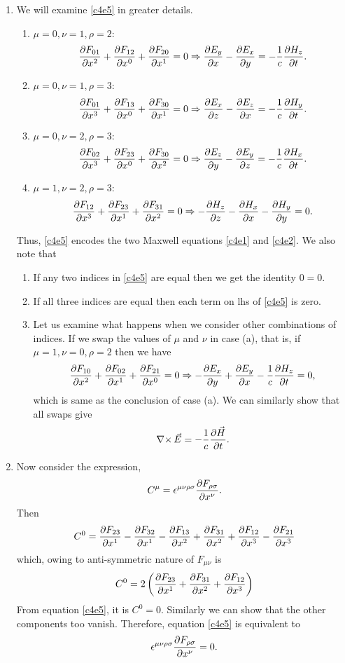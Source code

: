 \begin{enumerate}
\item We will examine \eqref{c4e5} in greater details.
\begin{enumerate}
\item $\mu = 0, \nu = 1, \rho = 2$:
\[
\frac{\partial{F_{01}}}{\partial{x^2}} + \frac{\partial{F_{12}}}{\partial{x^0}} + \frac{\partial{F_{20}}}{\partial{x^1}} = 0 \Rightarrow
\frac{\partial{E_y}}{\partial{x}} - \frac{\partial{E_x}}{\partial{y}} = - \frac{1}{c}\frac{\partial{H_z}}{\partial{t}}.
\]

\item $\mu = 0, \nu = 1, \rho = 3$:
\[
\frac{\partial{F_{01}}}{\partial{x^3}} + \frac{\partial{F_{13}}}{\partial{x^0}} + \frac{\partial{F_{30}}}{\partial{x^1}} = 0 \Rightarrow
\frac{\partial{E_x}}{\partial{z}} - \frac{\partial{E_z}}{\partial{x}} = - \frac{1}{c}\frac{\partial{H_y}}{\partial{t}}.
\]

\item $\mu = 0, \nu = 2, \rho = 3$:
\[
\frac{\partial{F_{02}}}{\partial{x^3}} + \frac{\partial{F_{23}}}{\partial{x^0}} + \frac{\partial{F_{30}}}{\partial{x^2}} = 0 \Rightarrow
\frac{\partial{E_z}}{\partial{y}} - \frac{\partial{E_y}}{\partial{z}} = - \frac{1}{c}\frac{\partial{H_x}}{\partial{t}}.
\]

\item $\mu = 1, \nu = 2, \rho = 3$:
\[
\frac{\partial{F_{12}}}{\partial{x^3}} + \frac{\partial{F_{23}}}{\partial{x^1}} + \frac{\partial{F_{31}}}{\partial{x^2}} = 0 \Rightarrow
-\frac{\partial{H_z}}{\partial{z}} - \frac{\partial{H_x}}{\partial{x}} - \frac{\partial{H_y}}{\partial{y}} = 0.
\]
\end{enumerate}
Thus, \eqref{c4e5} encodes the two Maxwell equations \eqref{c4e1} and 
\eqref{c4e2}.
We also note that
\begin{enumerate}
\item If any two indices in \eqref{c4e5} are equal then we get the identity 
$0=0$.
\item If all three indices are equal then each term on lhs of \eqref{c4e5} is
zero.
\item Let us examine what happens when we consider other combinations of 
indices. If we swap the values of $\mu$ and $\nu$ in case (a), that is, if 
$\mu = 1, \nu = 0, \rho = 2$ then we have
\[
\frac{\partial{F_{10}}}{\partial{x^2}} + \frac{\partial{F_{02}}}{\partial{x^1}} + \frac{\partial{F_{21}}}{\partial{x^0}} = 0 \Rightarrow
-\frac{\partial{E_x}}{\partial{y}} + \frac{\partial{E_y}}{\partial{x}} - \frac{1}{c}\frac{\partial{H_z}}{\partial{t}} = 0,
\]
which is same as the conclusion of case (a). We can similarly show that all 
swaps give 
\[
\operatorname{\nabla\times}\vec{E} = -\frac{1}{c}\frac{\partial{\vec{H}}}{\partial{t}}.
\]
\end{enumerate}

\item Now consider the expression,
\begin{equation}\label{c4e6}
C^\mu = \epsilon^{\mu\nu\rho\sigma}\frac{\partial{F_{\rho\sigma}}}{\partial{x^\nu}}.
\end{equation}
Then
\[
C^0 = \frac{\partial{F_{23}}}{\partial{x^1}} - \frac{\partial{F_{32}}}{\partial{x^1}} - \frac{\partial{F_{13}}}{\partial{x^2}} + 
\frac{\partial{F_{31}}}{\partial{x^2}} + \frac{\partial{F_{12}}}{\partial{x^3}} - \frac{\partial{F_{21}}}{\partial{x^3}}
\]
which, owing to anti-symmetric nature of $F_{\mu\nu}$ is
\[
C^0 = 2\left(\frac{\partial{F_{23}}}{\partial{x^1}} + \frac{\partial{F_{31}}}{\partial{x^2}} + \frac{\partial{F_{12}}}{\partial{x^3}}\right)
\]
From equation \eqref{c4e5}, it is $C^0 = 0$. Similarly we can show that the 
other components too vanish. Therefore, equation \eqref{c4e5} is equivalent to
\begin{equation}\label{c4e7}
\epsilon^{\mu\nu\rho\sigma}\frac{\partial{F_{\rho\sigma}}}{\partial{x^\nu}} = 0.
\end{equation}


\end{enumerate}
